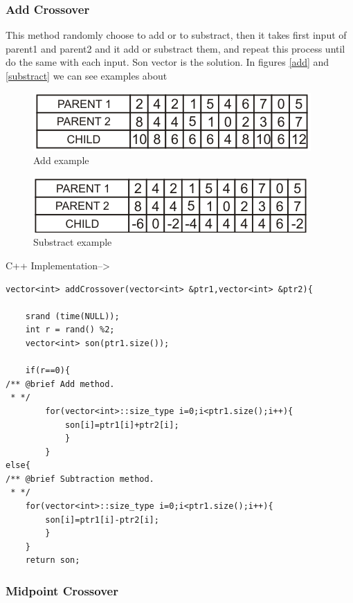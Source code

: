 \documentclass[letterpaper]{article}
\begin{document}
\subsubsection{Add Crossover}

This method randomly choose to add or to substract, then it takes first input of parent1 and parent2 and it add or substract them, and repeat this process until do the same with each input. Son vector is the solution. In figures \ref{add} and \ref{substract} we can see examples about 

\begin{figure}[h]
\centering
\includegraphics[width=0.7\linewidth]{images/add.png}
\caption{Add example}
\label{F:add}
\end{figure}

\begin{figure}[h]
\centering
\includegraphics[width=0.7\linewidth]{images/substract.png}
\caption{Substract example}
\label{F:substract}
\end{figure}


\bigskip
\bigskip
C++ Implementation-->
\bigskip
\bigskip




\lstset{language=C++}
\begin{lstlisting}
vector<int> addCrossover(vector<int> &ptr1,vector<int> &ptr2){
	
	srand (time(NULL));
	int r = rand() %2;
	vector<int> son(ptr1.size());
	
	if(r==0){
/** @brief Add method.
 * */		
		for(vector<int>::size_type i=0;i<ptr1.size();i++){
			son[i]=ptr1[i]+ptr2[i];
			}
		}
else{
/** @brief Subtraction method.
 * */	
	for(vector<int>::size_type i=0;i<ptr1.size();i++){
		son[i]=ptr1[i]-ptr2[i];
		}
	}
	return son;
\end{lstlisting}

\subsubsection{Midpoint Crossover}
\end{document}
